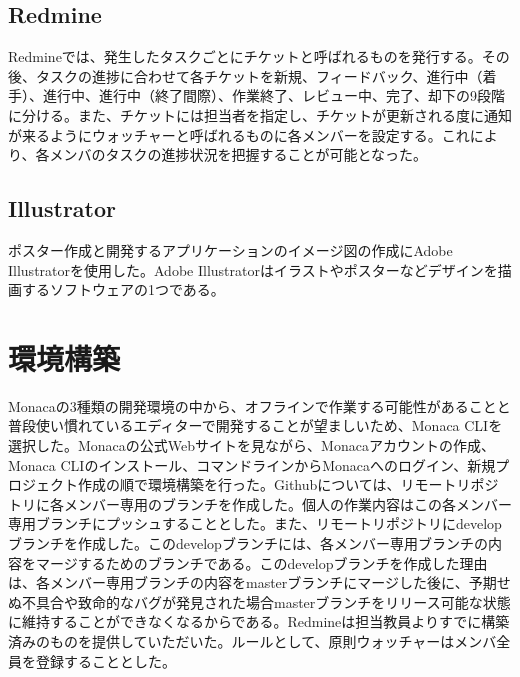 \subsection{Redmine}%
Redmineでは、発生したタスクごとにチケットと呼ばれるものを発行する。その後、タスクの進捗に合わせて各チケットを新規、フィードバック、進行中（着手）、進行中、進行中（終了間際）、作業終了、レビュー中、完了、却下の9段階に分ける。また、チケットには担当者を指定し、チケットが更新される度に通知が来るようにウォッチャーと呼ばれるものに各メンバーを設定する。これにより、各メンバのタスクの進捗状況を把握することが可能となった。


\subsection{Illustrator}%
ポスター作成と開発するアプリケーションのイメージ図の作成にAdobe Illustratorを使用した。Adobe Illustratorはイラストやポスターなどデザインを描画するソフトウェアの1つである。

\section{環境構築}%
Monacaの3種類の開発環境の中から、オフラインで作業する可能性があることと普段使い慣れているエディターで開発することが望ましいため、Monaca CLIを選択した。Monacaの公式Webサイトを見ながら、Monacaアカウントの作成、Monaca CLIのインストール、コマンドラインからMonacaへのログイン、新規プロジェクト作成の順で環境構築を行った。Githubについては、リモートリポジトリに各メンバー専用のブランチを作成した。個人の作業内容はこの各メンバー専用ブランチにプッシュすることとした。また、リモートリポジトリにdevelopブランチを作成した。このdevelopブランチには、各メンバー専用ブランチの内容をマージするためのブランチである。このdevelopブランチを作成した理由は、各メンバー専用ブランチの内容をmasterブランチにマージした後に、予期せぬ不具合や致命的なバグが発見された場合masterブランチをリリース可能な状態に維持することができなくなるからである。Redmineは担当教員よりすでに構築済みのものを提供していただいた。ルールとして、原則ウォッチャーはメンバ全員を登録することとした。







